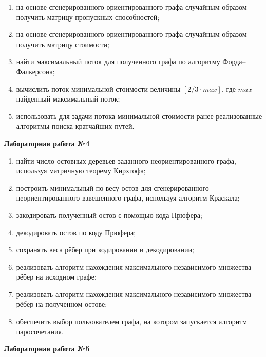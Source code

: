 \documentclass[14pt,a4paper]{extarticle}
\begin{document}
\begin{enumerate}[start=17]
    \item на основе сгенерированного ориентированного графа случайным образом получить матрицу пропускных способностей;
    \item на основе сгенерированного ориентированного графа случайным образом получить матрицу стоимости;
    \item найти максимальный поток для полученного графа по алгоритму Форда--Фалкерсона;
    \item вычислить поток минимальной стоимости величины \([2/3 \cdot max]\), где \(max\) --- найденный максимальный поток;
    \item использовать для задачи потока минимальной стоимости ранее реализованные алгоритмы поиска кратчайших путей.
\end{enumerate}

\textbf{Лабораторная работа №4}

\begin{enumerate}[start=22]
    \item найти число остовных деревьев заданного неориентированного графа, используя матричную теорему Кирхгофа;
    \item построить минимальный по весу остов для сгенерированного неориентированного взвешенного графа, используя алгоритм Краскала;
    \item закодировать полученный остов с помощью кода Прюфера;
    \item декодировать остов по коду Прюфера;
    \item сохранять веса рёбер при кодировании и декодировании;
    \item реализовать алгоритм нахождения максимального независимого множества рёбер на исходном графе;
    \item реализовать алгоритм нахождения максимального независимого множества рёбер на полученном остове;
    \item обеспечить выбор пользователем графа, на котором запускается алгоритм паросочетания.
\end{enumerate}

\textbf{Лабораторная работа №5}
\end{document}
